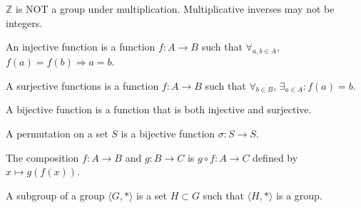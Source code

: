 \documentclass[crop=false,class=book,oneside]{standalone}
\begin{document}
                \begin{remark}
                    $\mathbb{Z}$ is NOT a group under
                    multiplication. Multiplicative inverses may
                    not be integers.
                \end{remark}
                \begin{definition}
                    An injective function is a function
                    $f:A\rightarrow B$ such that
                    $\forall_{a,b\in A}$,
                    $f(a)=f(b)\Rightarrow a=b$.
                \end{definition}
                \begin{definition}
                    A surjective functions is a function
                    $f:A\rightarrow B$ such that
                    $\forall_{b\in B}$,
                    $\exists_{a\in A}:f(a)=b$.
                \end{definition}
                \begin{definition}
                    A bijective function is a function that
                    is both injective and surjective.
                \end{definition}
                \begin{definition}
                    A permutation on a set $S$ is a
                    bijective function $\sigma:S\rightarrow S$.
                \end{definition}
                \begin{definition}
                    The composition $f:A\rightarrow B$ and
                    $g:B\rightarrow C$ is $g\circ f:A\rightarrow C$
                    defined by $x\mapsto g(f(x))$.
                \end{definition}
                \begin{definition}
                    A subgroup of a group $\langle G,*\rangle$ is
                    a set $H\subset G$ such that $\langle H,*\rangle$
                    is a group.
                \end{definition}
\end{document}
